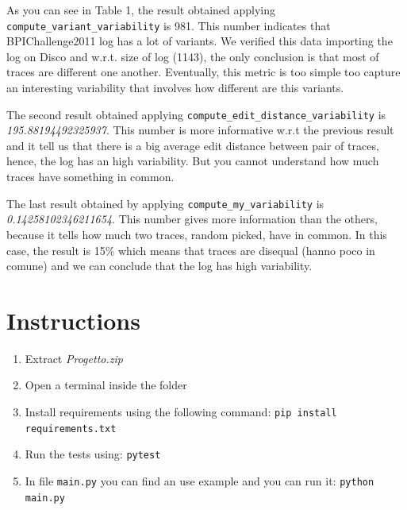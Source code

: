 \documentclass[12pt]{article}
\newcounter{lastnote}
\begin{document}
As you can see in Table 1, the result obtained applying \texttt{compute\_variant\_variability} is 981. This number indicates that BPIChallenge2011 log has a lot of variants. We verified this data importing the log on Disco and w.r.t. size of log (1143), the only conclusion is that most of traces are different one another. Eventually, this metric is too simple too capture an interesting variability that involves how different are this variants.

\smallskip  

The second result obtained applying \texttt{compute\_edit\_distance\_variability} is \textit{195.88194492325937}. This number is more informative w.r.t the previous result and it tell us that there is a big average edit distance between pair of traces, hence, the log has an high variability. But you cannot understand how much traces have something in common.

\smallskip

The last result obtained by applying \texttt{compute\_my\_variability} is \textit{0.14258102346211654}. This number gives more information than the others, because it tells how much two traces, random picked, have in common. In this case, the result is 15\% which means that traces are disequal (hanno poco in comune) and we can conclude that the log has high variability.

\section*{Instructions}

\begin{enumerate}
	\item Extract \textit{Progetto.zip}
	\item Open a terminal inside the folder
	\item Install requirements using the following command: \texttt{pip install requirements.txt}
	\item Run the tests using: \texttt{pytest}
	\item In file \texttt{main.py} you can find an use example and you can run it: \texttt{python main.py}
\end{enumerate}







\end{document}
